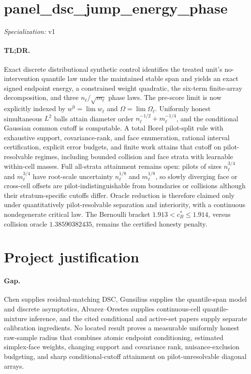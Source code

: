 \documentclass{article}
\begin{document}
\sloppy

\section*{panel\_\allowbreak{}dsc\_\allowbreak{}jump\_\allowbreak{}energy\_\allowbreak{}phase}

\noindent\textit{Specialization:} v1\par

\paragraph{TL;DR.} Exact discrete distributional synthetic control identifies the treated unit's no-intervention quantile law under the maintained stable span and yields an exact signed endpoint energy, a constrained weight quadratic, the six-term finite-array decomposition, and three \(n_\ell/\sqrt{m_\ell}\) phase laws.  The pre-score limit is now explicitly indexed by \(w^0=\lim w_\ell\) and \(\Omega=\lim\Omega_\ell\).  Uniformly honest simultaneous \(L^2\) balls attain diameter order \(n_\ell^{-1/2}+m_\ell^{-1/4}\), and the conditional Gaussian common cutoff is computable.  A total Borel pilot-split rule with exhaustive support, covariance-rank, and face enumeration, rational interval certification, explicit error budgets, and finite work attains that cutoff on pilot-resolvable regimes, including bounded collision and face strata with learnable within-cell masses.  Full all-strata attainment remains open: pilots of sizes \(n_\ell^{3/4}\) and \(m_\ell^{3/4}\) have root-scale uncertainty \(n_\ell^{1/8}\) and \(m_\ell^{1/8}\), so slowly diverging face or cross-cell offsets are pilot-indistinguishable from boundaries or collisions although their stratum-specific cutoffs differ.  Oracle reduction is therefore claimed only under quantitatively pilot-resolvable separation and interiority, with a continuous nondegenerate critical law.  The Bernoulli bracket \(1.913<c_B^*\leq1.914\), versus collision oracle \(1.38590382435\), remains the certified honesty penalty.

\section{Project justification}

\paragraph{Gap.} Chen supplies residual-matching DSC, Gunsilius supplies the quantile-span model and discrete asymptotics, Alvarez--Orestes supplies continuous-cell quantile-mixture inference, and the cited conditional and active-set papers supply separate calibration ingredients.  No located result proves a measurable uniformly honest raw-sample radius that combines atomic endpoint conditioning, estimated simplex-face weights, changing support and covariance rank, nuisance-exclusion budgeting, and sharp conditional-cutoff attainment on pilot-unresolvable diagonal arrays.
\end{document}
